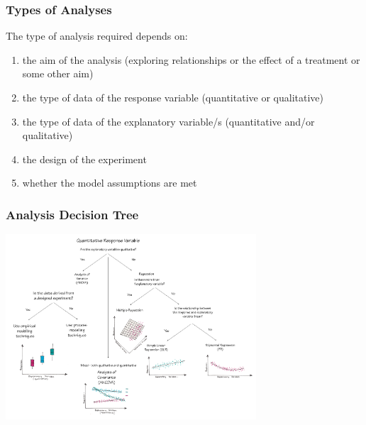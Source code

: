 \begin{frame}\frametitle{Types of Analyses}
The type of analysis required depends on:

\begin{enumerate}
\item the aim of the analysis (exploring relationships or the effect of a treatment or some other aim)
\item the type of data of the response variable (quantitative or qualitative)
\item the type of data of the explanatory variable/s (quantitative and/or qualitative)
\item the design of the experiment
\item \textcolor[rgb]{0.00,0.74,0.74}{whether the model assumptions are met}
\end{enumerate}

\end{frame}


\begin{frame}\frametitle{Analysis Decision Tree}
\centering
\includegraphics[width = 0.7\textwidth]{LMFlowChart}
\end{frame}

